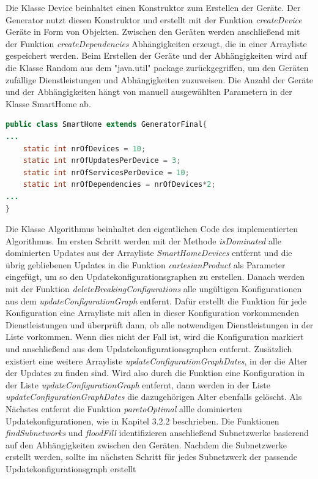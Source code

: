Die Klasse Device beinhaltet einen Konstruktor zum Erstellen der Geräte. Der Generator nutzt diesen Konstruktor und erstellt mit der
Funktion \textit{createDevice} Geräte in Form von Objekten. Zwischen den Geräten werden anschließend mit der Funktion \textit{createDependencies} Abhängigkeiten erzeugt,
die in einer Arrayliste  gespeichert werden.
Beim Erstellen der Geräte und der Abhängigkeiten wird auf die Klasse Random aus dem "java.util" package zurückgegriffen, um den Geräten
zufällige Dienstleistungen und Abhängigkeiten zuzuweisen. Die Anzahl der Geräte und der Abhängigkeiten hängt von manuell ausgewählten
Parametern in der Klasse SmartHome ab.
\begin{lstlisting}[language=Java]
public class SmartHome extends GeneratorFinal{
... 
    static int nrOfDevices = 10;
    static int nrOfUpdatesPerDevice = 3;
    static int nrOfServicesPerDevice = 10;
    static int nrOfDependencies = nrOfDevices*2;
...
}
\end{lstlisting}
Die Klasse Algorithmus beinhaltet den eigentlichen Code des implementierten Algorithmus.
Im ersten Schritt werden mit der Methode \textit{isDominated} alle dominierten Updates aus der Arrayliste \textit{SmartHomeDevices} entfernt und
die übrig gebliebenen Updates in die Funktion \textit{cartesianProduct} als Parameter eingefügt, um so den Updatekonfigurationsgraphen zu erstellen.
Danach werden mit der Funktion \textit{deleteBreakingConfigurations} alle ungültigen Konfigurationen aus dem \textit{updateConfigurationGraph} entfernt.
Dafür erstellt die Funktion für jede Konfiguration eine Arrayliste mit allen in dieser Konfiguration vorkommenden Dienstleistungen und überprüft
dann, ob alle notwendigen Dienstleistungen in der Liste vorkommen. Wenn dies nicht der Fall ist, wird die Konfiguration markiert und anschließend
aus dem Updatekonfigurationsgraphen entfernt. 
Zusätzlich existiert eine weitere Arrayliste \textit{updateConfigurationGraphDates}, in der die Alter der Updates zu finden sind. Wird also durch die Funktion eine
Konfiguration in der Liste \textit{updateConfigurationGraph} entfernt, dann werden in der Liste \textit{updateConfigurationGraphDates} die dazugehörigen Alter ebenfalls
gelöscht.
Als Nächstes entfernt die Funktion \textit{paretoOptimal} allle dominierten Updatekonfigurationen, wie in Kapitel 3.2.2 beschrieben.
Die Funktionen \textit{findSubnetworks} und \textit{floodFill} identifizieren anschließend Subnetzwerke basierend auf den Abhängigkeiten
zwischen den Geräten. Nachdem die Subnetzwerke erstellt werden, sollte im nächsten Schritt für jedes Subnetzwerk der passende Updatekonfigurationsgraph erstellt
